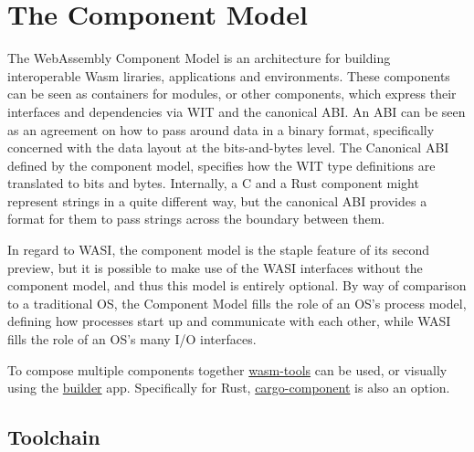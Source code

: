 \section{The Component Model}
\label{chap:component_model}


The WebAssembly Component Model is an architecture for building interoperable \gls{Wasm} liraries, applications and environments. These components can be seen as containers for modules, or other components, which express their interfaces and dependencies via \gls{WIT} and the canonical \gls{ABI}. 
An \gls{ABI} can be seen as an agreement on how to pass around data in a binary format, specifically concerned with the data layout at the bits-and-bytes level. The Canonical \gls{ABI} defined by the component model, specifies how the \gls{WIT} type definitions are translated to bits and bytes. Internally, a C and a Rust component might represent strings in a quite different way, but the canonical \gls{ABI} provides a format for them to pass strings across the boundary between them.

In regard to \gls{WASI}, the component model is the staple feature of its second preview, but it is possible to make use of the \gls{WASI} interfaces without the component model, and thus this model is entirely optional. By way of comparison to a traditional \gls{OS}, the Component Model fills the role of an \gls{OS}'s process model, defining how processes start up and communicate with each other, while \gls{WASI} fills the role of an \gls{OS}'s many I/O interfaces.

To compose multiple components together \href{https://github.com/bytecodealliance/wasm-tools}{wasm-tools} can be used, or visually using the \href{https://wasmbuilder.app/}{builder} app. Specifically for Rust, \href{https://github.com/bytecodealliance/cargo-component}{cargo-component} is also an option.
 
\subsection{Toolchain}
\label{sec:guest}


